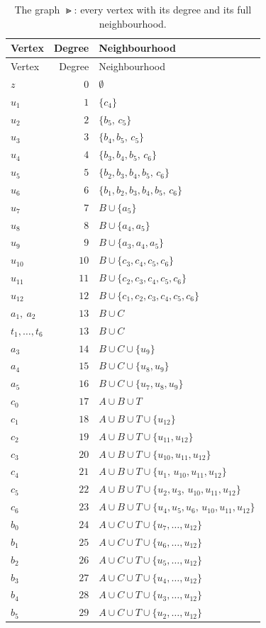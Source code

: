 \documentclass[11pt,a4paper]{article}
\theoremstyle{plain}
\theoremstyle{definition}
\theoremstyle{remark}
\begin{document}
\begin{longtable}{@{}l r l@{}}
\caption{The graph $\Gt$: every vertex with its degree and its full neighbourhood.}\label{tab:graph}\\
\toprule
Vertex & Degree & Neighbourhood \\
\midrule
\endfirsthead
\toprule
Vertex & Degree & Neighbourhood \\
\midrule
\endhead
\bottomrule
\endfoot
\bottomrule
\endlastfoot
$z$ & $0$ & $\emptyset$ \\
$u_1$ & $1$ & $\{c_4\}$ \\
$u_2$ & $2$ & $\{b_5,\,c_5\}$ \\
$u_3$ & $3$ & $\{b_4,b_5,\,c_5\}$ \\
$u_4$ & $4$ & $\{b_3,b_4,b_5,\,c_6\}$ \\
$u_5$ & $5$ & $\{b_2,b_3,b_4,b_5,\,c_6\}$ \\
$u_6$ & $6$ & $\{b_1,b_2,b_3,b_4,b_5,\,c_6\}$ \\
$u_7$ & $7$ & $B\cup\{a_5\}$ \\
$u_8$ & $8$ & $B\cup\{a_4,a_5\}$ \\
$u_9$ & $9$ & $B\cup\{a_3,a_4,a_5\}$ \\
$u_{10}$ & $10$ & $B\cup\{c_3,c_4,c_5,c_6\}$ \\
$u_{11}$ & $11$ & $B\cup\{c_2,c_3,c_4,c_5,c_6\}$ \\
$u_{12}$ & $12$ & $B\cup\{c_1,c_2,c_3,c_4,c_5,c_6\}$ \\
$a_1,\ a_2$ & $13$ & $B\cup C$ \\
$t_1,\dots,t_6$ & $13$ & $B\cup C$ \\
$a_3$ & $14$ & $B\cup C\cup\{u_9\}$ \\
$a_4$ & $15$ & $B\cup C\cup\{u_8,u_9\}$ \\
$a_5$ & $16$ & $B\cup C\cup\{u_7,u_8,u_9\}$ \\
$c_0$ & $17$ & $A\cup B\cup T$ \\
$c_1$ & $18$ & $A\cup B\cup T\cup\{u_{12}\}$ \\
$c_2$ & $19$ & $A\cup B\cup T\cup\{u_{11},u_{12}\}$ \\
$c_3$ & $20$ & $A\cup B\cup T\cup\{u_{10},u_{11},u_{12}\}$ \\
$c_4$ & $21$ & $A\cup B\cup T\cup\{u_1,\,u_{10},u_{11},u_{12}\}$ \\
$c_5$ & $22$ & $A\cup B\cup T\cup\{u_2,u_3,\,u_{10},u_{11},u_{12}\}$ \\
$c_6$ & $23$ & $A\cup B\cup T\cup\{u_4,u_5,u_6,\,u_{10},u_{11},u_{12}\}$ \\
$b_0$ & $24$ & $A\cup C\cup T\cup\{u_7,\dots,u_{12}\}$ \\
$b_1$ & $25$ & $A\cup C\cup T\cup\{u_6,\dots,u_{12}\}$ \\
$b_2$ & $26$ & $A\cup C\cup T\cup\{u_5,\dots,u_{12}\}$ \\
$b_3$ & $27$ & $A\cup C\cup T\cup\{u_4,\dots,u_{12}\}$ \\
$b_4$ & $28$ & $A\cup C\cup T\cup\{u_3,\dots,u_{12}\}$ \\
$b_5$ & $29$ & $A\cup C\cup T\cup\{u_2,\dots,u_{12}\}$ \\
\end{longtable}
\end{document}

